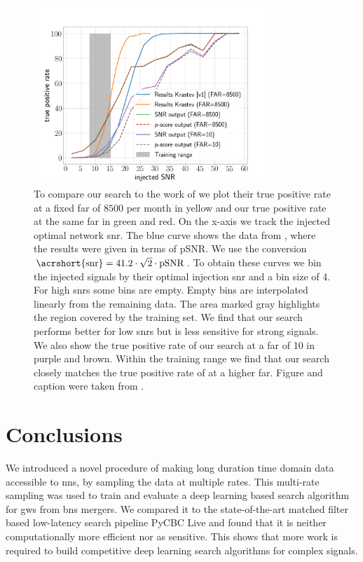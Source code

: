 \begin{figure}
	\centering
	\includegraphics[width=0.8\textwidth]{chapters/bnsnet/images/compare_krastev_v2}
	\caption[True positive rate]{To compare our search to the work of \cite{Krastev:2019koe} we plot their true positive rate at a fixed \acrshort{far} of $8500$ per month in yellow and our true positive rate at the same \acrshort{far} in green and red. On the x-axis we track the injected optimal network \acrshort{snr}. The blue curve shows the data from \cite{Krastev:2019aaa}, where the results were given in terms of pSNR. We use the conversion $\text{\acrshort{snr}} = 41.2\cdot\sqrt{2}\cdot\text{pSNR}$. To obtain these curves we bin the injected signals by their optimal injection \acrshort{snr} and a bin size of 4. For high \acrshort{snr}s some bins are empty. Empty bins are interpolated linearly from the remaining data. The area marked gray highlights the region covered by the training set. We find that our search performs better for low \acrshort{snr}s but is less sensitive for strong signals. We also show the true positive rate of our search at a \acrshort{far} of 10 in purple and brown. Within the training range we find that our search closely matches the true positive rate of \cite{Krastev:2019aaa} at a higher \acrshort{far}. Figure and caption were taken from \cite{Schafer:2020kor}.}\label{fig:bns_tpr}
\end{figure}

\section{Conclusions}
We introduced a novel procedure of making long duration time domain data accessible to \acrshort{nn}s, by sampling the data at multiple rates. This multi-rate sampling was used to train and evaluate a deep learning based search algorithm for \acrshort{gw}s from \acrshort{bns} mergers. We compared it to the state-of-the-art matched filter based low-latency search pipeline PyCBC Live and found that it is neither computationally more efficient nor as sensitive. This shows that more work is required to build competitive deep learning search algorithms for complex signals.

